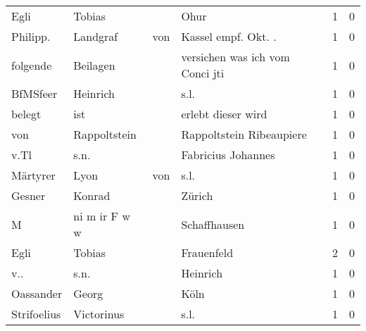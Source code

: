 \begin{tabular}{llllrr}
                     Egli &                             Tobias &             &                                        Ohur &          1 &         0 \\
                 Philipp. &                           Landgraf &         von &                        Kassel empf. Okt. .  &          1 &         0 \\
                 folgende &                           Beilagen &             &             versichen was ich vom Conci jti &          1 &         0 \\
                 BfMSfeer &                           Heinrich &             &                                        s.l. &          1 &         0 \\
                   belegt &                                ist &             &                          erlebt dieser wird &          1 &         0 \\
                      von &                       Rappoltstein &             &                    Rappoltstein Ribeaupiere &          1 &         0 \\
                     v.Tl &                               s.n. &             &                          Fabricius Johannes &          1 &         0 \\
                 Märtyrer &                               Lyon &         von &                                        s.l. &          1 &         0 \\
                   Gesner &                             Konrad &             &                                      Zürich &          1 &         0 \\
                        M &                      ni m ir F w w &             &                                Schaffhausen &          1 &         0 \\
                     Egli &                             Tobias &             &                                  Frauenfeld &          2 &         0 \\
                      v.. &                               s.n. &             &                                    Heinrich &          1 &         0 \\
                Oassander &                              Georg &             &                                        Köln &          1 &         0 \\
              Strifoelius &                         Victorinus &             &                                        s.l. &          1 &         0 \\

\end{tabular}
